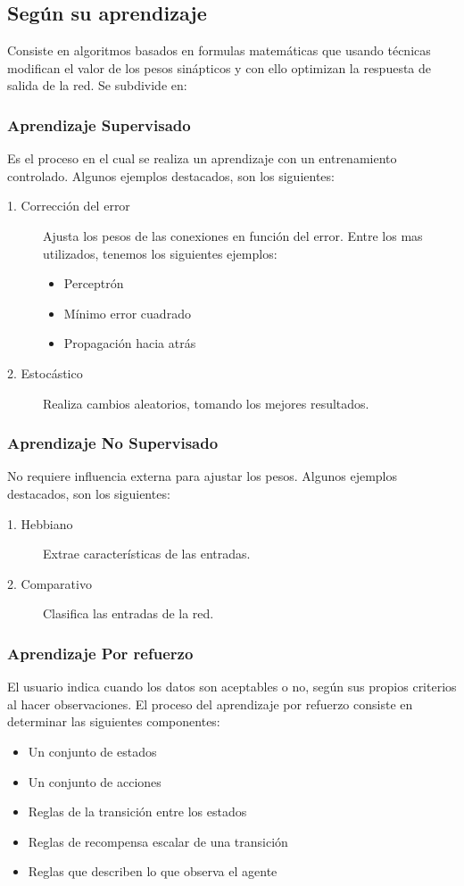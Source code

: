 \documentclass[11pt,titlepage]{report}
\begin{document}
\subsection{Según su aprendizaje}
 Consiste en algoritmos basados en formulas matemáticas que usando técnicas modifican el valor de los pesos sinápticos y con ello optimizan la respuesta de salida de la red. Se subdivide en:
	
\subsubsection{Aprendizaje Supervisado}
Es el proceso en el cual se realiza un aprendizaje con un entrenamiento controlado. Algunos ejemplos destacados, son los siguientes:
	\begin{description}
		\item[1. Corrección del error] Ajusta los pesos de las conexiones en función del error. Entre los mas utilizados, tenemos los siguientes ejemplos:
		\begin{itemize}
			\item Perceptrón
			\item Mínimo error cuadrado
			\item Propagación hacia atrás
		\end{itemize}
		\item[2. Estocástico] Realiza cambios aleatorios, tomando los mejores resultados.  
		
	\end{description}
\subsubsection{Aprendizaje No Supervisado}
	No requiere influencia externa para ajustar los pesos.  Algunos ejemplos destacados, son los siguientes:
	\begin{description}
		\item[1. Hebbiano]	 Extrae características de las entradas.
		\item[2. Comparativo] Clasifica las entradas de la red.	          
	\end{description}
\subsubsection{Aprendizaje Por refuerzo} El usuario indica cuando los datos son aceptables o no, según sus propios criterios al hacer observaciones. El proceso del aprendizaje por refuerzo consiste en determinar las siguientes componentes:
\begin{itemize}
\item Un conjunto de estados
\item Un conjunto de acciones
\item Reglas de la transición entre los estados
\item Reglas de recompensa escalar de una transición
\item Reglas que describen lo que observa el agente
\end{itemize}
\end{document}
